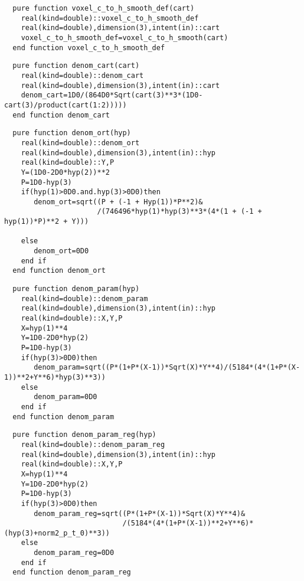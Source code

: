 \begin{Verbatim}
  pure function voxel_c_to_h_smooth_def(cart)
    real(kind=double)::voxel_c_to_h_smooth_def
    real(kind=double),dimension(3),intent(in)::cart
    voxel_c_to_h_smooth_def=voxel_c_to_h_smooth(cart)
  end function voxel_c_to_h_smooth_def
\end{Verbatim}

\begin{Verbatim}
  pure function denom_cart(cart)
    real(kind=double)::denom_cart
    real(kind=double),dimension(3),intent(in)::cart
    denom_cart=1D0/(864D0*Sqrt(cart(3)**3*(1D0-cart(3)/product(cart(1:2)))))
  end function denom_cart
\end{Verbatim}

\begin{Verbatim}
  pure function denom_ort(hyp)
    real(kind=double)::denom_ort
    real(kind=double),dimension(3),intent(in)::hyp
    real(kind=double)::Y,P
    Y=(1D0-2D0*hyp(2))**2
    P=1D0-hyp(3)
    if(hyp(1)>0D0.and.hyp(3)>0D0)then
       denom_ort=sqrt((P + (-1 + Hyp(1))*P**2)&
                      /(746496*hyp(1)*hyp(3)**3*(4*(1 + (-1 + hyp(1))*P)**2 + Y)))

    else
       denom_ort=0D0
    end if
  end function denom_ort
\end{Verbatim}

\begin{Verbatim}
  pure function denom_param(hyp)
    real(kind=double)::denom_param
    real(kind=double),dimension(3),intent(in)::hyp
    real(kind=double)::X,Y,P
    X=hyp(1)**4
    Y=1D0-2D0*hyp(2)
    P=1D0-hyp(3)
    if(hyp(3)>0D0)then
       denom_param=sqrt((P*(1+P*(X-1))*Sqrt(X)*Y**4)/(5184*(4*(1+P*(X-1))**2+Y**6)*hyp(3)**3))
    else
       denom_param=0D0
    end if
  end function denom_param
\end{Verbatim}

\begin{Verbatim}
  pure function denom_param_reg(hyp)
    real(kind=double)::denom_param_reg
    real(kind=double),dimension(3),intent(in)::hyp
    real(kind=double)::X,Y,P
    X=hyp(1)**4
    Y=1D0-2D0*hyp(2)
    P=1D0-hyp(3)
    if(hyp(3)>0D0)then
       denom_param_reg=sqrt((P*(1+P*(X-1))*Sqrt(X)*Y**4)&
                            /(5184*(4*(1+P*(X-1))**2+Y**6)*(hyp(3)+norm2_p_t_0)**3))
    else
       denom_param_reg=0D0
    end if
  end function denom_param_reg
\end{Verbatim}


